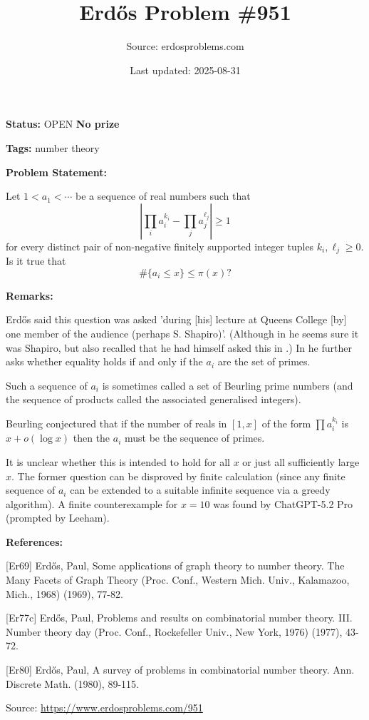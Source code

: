 \documentclass{article}
\title{Erd\H{o}s Problem \#951}
\date{Last updated: 2025-08-31}
\author{Source: erdosproblems.com}
\begin{document}
\maketitle

\noindent\textbf{Status:} OPEN \quad \textbf{No prize}

\noindent\textbf{Tags:} number theory

\medskip
\noindent\textbf{Problem Statement:}

Let $1<a_1<\cdots$ be a sequence of real numbers such that\[\left\lvert \prod_i a_i^{k_i}-\prod_j a_j^{\ell_j}\right\rvert \geq 1\]for every distinct pair of non-negative finitely supported integer tuples $k_i,\ell_j\geq 0$. Is it true that\[\#\{ a_i \leq x\} \leq \pi(x)?\]

\bigskip
\noindent\textbf{Remarks:}

Erd\H{o}s \cite{Er77c} said this question was asked 'during [his] lecture at Queens College [by] one member of the audience (perhaps S. Shapiro)'. (Although in \cite{Er80} he seems sure it was Shapiro, but also recalled that he had himself asked this in \cite{Er69}.) In \cite{Er80} he further asks whether equality holds if and only if the $a_i$ are the set of primes.

Such a sequence of $a_i$ is sometimes called a set of Beurling prime numbers (and the sequence of products called the associated generalised integers).

Beurling conjectured that if the number of reals in $[1,x]$ of the form $\prod a_i^{k_i}$ is $x+o(\log x)$ then the $a_i$ must be the sequence of primes.

It is unclear whether this is intended to hold for all $x$ or just all sufficiently large $x$. The former question can be disproved by finite calculation (since any finite sequence of $a_i$ can be extended to a suitable infinite sequence via a greedy algorithm). A finite counterexample for $x=10$ was found by ChatGPT-5.2 Pro (prompted by Leeham).

\bigskip
\noindent\textbf{References:}

[Er69] Erd\H{o}s, Paul, Some applications of graph theory to number theory. The Many Facets of Graph Theory (Proc. Conf.,
Western Mich. Univ., Kalamazoo, Mich., 1968) (1969), 77-82.
 
 [Er77c] Erd\H{o}s, Paul, Problems and results on combinatorial number theory. III. Number theory day (Proc. Conf., Rockefeller Univ.,
New York, 1976) (1977), 43-72.
 
 [Er80] Erd\H{o}s, Paul, A survey of problems in combinatorial number theory. Ann. Discrete Math. (1980), 89-115.

\bigskip
\noindent\small{Source: \url{https://www.erdosproblems.com/951}}
\end{document}
